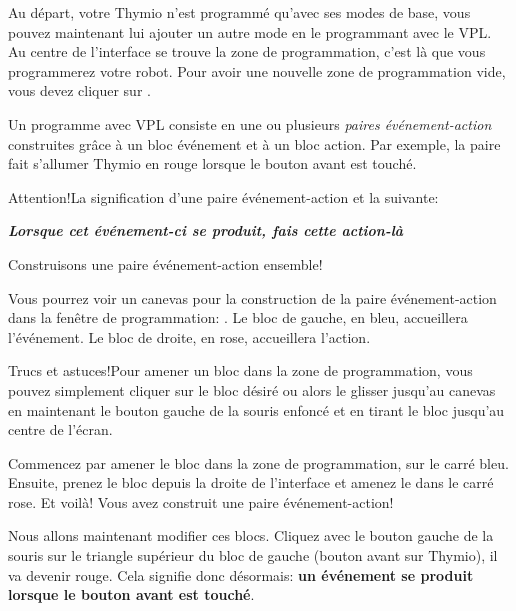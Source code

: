 
Au départ, votre Thymio n'est programmé qu'avec ses modes de base, vous pouvez maintenant lui ajouter un autre mode en le programmant avec le VPL. Au centre de l'interface se trouve la zone de programmation, c'est là que vous programmerez votre robot. Pour avoir une nouvelle zone de programmation vide, vous devez cliquer sur  .

Un programme avec VPL consiste en une ou plusieurs \textit{paires événement-action} construites grâce à un bloc événement et à un bloc action. Par exemple, la paire  fait s'allumer Thymio en rouge lorsque le bouton avant est touché.

\begin{bclogo}[couleur = green!30, arrondi = 0.1, logo = \bctakecare, ombre = true]{Attention!}La signification d'une paire événement-action et la suivante:
 
\textbf{\textit{Lorsque cet événement-ci se produit, fais cette action-là}}
\end{bclogo}

Construisons une paire événement-action ensemble! 

Vous pourrez voir un canevas pour la construction de la paire événement-action dans la \mbox{fenêtre} de programmation: . Le bloc de gauche, en bleu, accueillera l'événement. Le bloc de droite, en rose, accueillera l'action.


\begin{bclogo}[couleur = blue!30, arrondi = 0.1, logo = \bcinfo, ombre = true]{Trucs et astuces!}Pour amener un bloc dans la zone de programmation, vous pouvez simplement cliquer sur le bloc désiré ou alors le glisser jusqu'au canevas en maintenant le bouton gauche de la souris enfoncé et en tirant le bloc jusqu'au centre de l'écran.
\end{bclogo}

Commencez par amener le bloc  dans la zone de programmation, sur le carré bleu. Ensuite, prenez le bloc  depuis la droite de l'interface et amenez le dans le carré rose. Et voilà! Vous avez construit une paire événement-action!

Nous allons maintenant modifier ces blocs. Cliquez avec le bouton gauche de la souris sur le triangle supérieur du bloc de gauche (bouton avant sur Thymio), il va devenir rouge.  Cela signifie donc désormais:  \textbf{un événement se produit lorsque le bouton avant est touché}.

